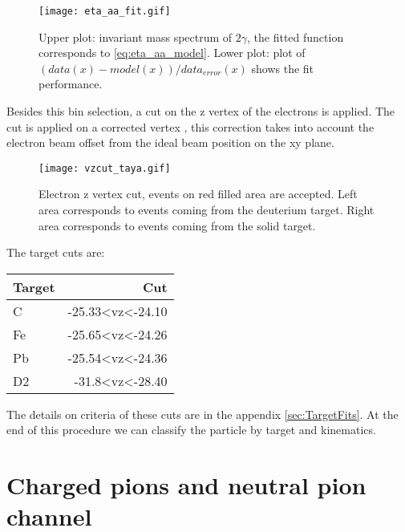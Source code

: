 \begin{figure}[!ht]
\centering
\texttt{[image: eta\_aa\_fit.gif]}
\caption{Upper plot: invariant mass spectrum of $2\gamma$, the fitted function corresponds to \eqref{eq:eta_aa_model}. Lower plot: plot of $(data(x)-model(x))/data_{error}(x)$ shows the fit performance.}
\label{fig:eta_aa_fit}
\end{figure}
%
Besides this bin selection, a cut on the z vertex of the electrons is applied.  The cut is applied on a corrected vertex \cite{Taya_analysis_note}, this correction takes into account the electron beam offset from the ideal beam position on the xy plane.
%
\begin{figure}[!ht]
\centering
\texttt{[image: vzcut\_taya.gif]}
\caption{Electron z vertex cut, events on red filled area are accepted. Left area corresponds to events coming from the deuterium target. Right area corresponds to events coming from the solid target.}
\label{fig:vze}
\end{figure}
The target cuts are:
\begin{table}[!htb]
\centering
\begin{tabular}{|l|r|}
\hline
Target&Cut\\ \hline
C&-25.33<vz<-24.10\\ \hline
Fe&-25.65<vz<-24.26\\ \hline
Pb&-25.54<vz<-24.36\\ \hline
D2&-31.8<vz<-28.40\\ \hline
\end{tabular}
\label{tb:targCut}
\end{table}
The details on criteria of these cuts are in the appendix \ref{sec:TargetFits}.
At the end of this procedure we can classify the particle by target and kinematics.
\clearpage
\section{Charged pions and neutral pion channel}
